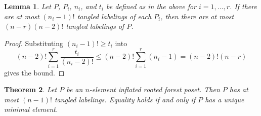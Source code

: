 \documentclass[11pt]{amsart}
\newtheorem{thm}{Theorem}[section]
\newtheorem{lemma}[thm]{Lemma}
\theoremstyle{definition}
\begin{document}
\begin{lemma}\label{reduction to connected case}
	Let $ P $, $ P_i $, $ n_i $, and $ t_i $ be defined as in the above for $ i=1,\ldots,r $. If there are at most $ (n_i-1)! $ tangled labelings of each $ P_i $, then there are at most $ (n-r)(n-2)! $ tangled labelings of $ P $.
\end{lemma}
\begin{proof}
	Substituting $ (n_i-1)!\geq t_i $ into \[(n-2)!\sum_{i=1}^r\frac{t_i}{(n_i-2)!}\leq(n-2)!\sum_{i=1}^r(n_i-1)=(n-2)!(n-r)\] gives the bound.
\end{proof}
\begin{thm}\label{(n-1)!}
	Let $ P $ be an $ n $-element inflated rooted forest poset. Then $ P $ has at most $ (n-1)! $ tangled labelings. Equality holds if and only if $ P $ has a unique minimal element.
\end{thm}
\end{document}
